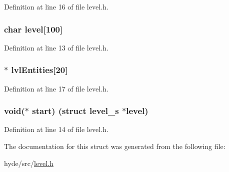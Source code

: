 Definition at line 16 of file level.\+h.

\hypertarget{structlevel__s_ae5466280972a960438b11876835dcfce}{}
\subsubsection[{level}]{\setlength{\rightskip}{0pt plus 5cm}char level\mbox{[}100\mbox{]}}\label{structlevel__s_ae5466280972a960438b11876835dcfce}


Definition at line 13 of file level.\+h.

\hypertarget{structlevel__s_a0c5197f36b7846057846ac14b04f1905}{}
\subsubsection[{lvl\+Entities}]{$\ast$ lvl\+Entities\mbox{[}20\mbox{]}}\label{structlevel__s_a0c5197f36b7846057846ac14b04f1905}


Definition at line 17 of file level.\+h.

\hypertarget{structlevel__s_ae165fdb01b6e5fc3cc11102430d82bc2}{}
\subsubsection[{start}]{\setlength{\rightskip}{0pt plus 5cm}void($\ast$ start) (struct {\bf level\+\_\+s} $\ast${\bf level})}\label{structlevel__s_ae165fdb01b6e5fc3cc11102430d82bc2}


Definition at line 14 of file level.\+h.



The documentation for this struct was generated from the following file\+:\begin{DoxyCompactItemize}
\item 
hyde/src/\hyperlink{level_8h}{level.\+h}\end{DoxyCompactItemize}

